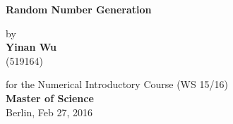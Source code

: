 \begin{center}

    {\Large{\bf Random Number Generation}} \vspace{0.5cm}



    \bigskip
    \bigskip

    {\normalsize by \\\vspace{0.5cm}
    {\bf Yinan Wu} \\
    (519164)} \vspace{1cm}


    {\normalsize for the Numerical Introductory Course (WS 15/16)\\
    {\bf Master of Science} \\
    Berlin, Feb 27, 2016}

\end{center}
